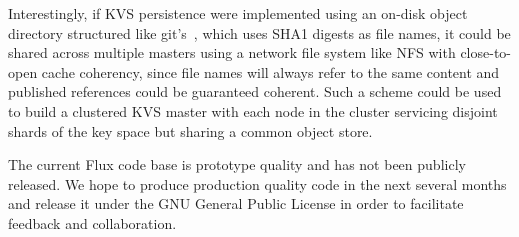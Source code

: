 Interestingly, if KVS persistence were implemented using an on-disk
object directory structured like git's~\cite{Chacon:2009:PG:1618548},
which uses SHA1 digests as file names, it could be shared across multiple
masters using a network file system like NFS with close-to-open cache
coherency, since file names will always refer to the same content and
published references could be guaranteed coherent.
Such a scheme could be used to build a clustered KVS master with each
node in the cluster servicing disjoint shards of the key space but
sharing a common object store.

The current Flux code base is prototype quality and has not
been publicly released.  We hope to produce production quality
code in the next several months and release it under the GNU General
Public License in order to facilitate feedback and collaboration.
